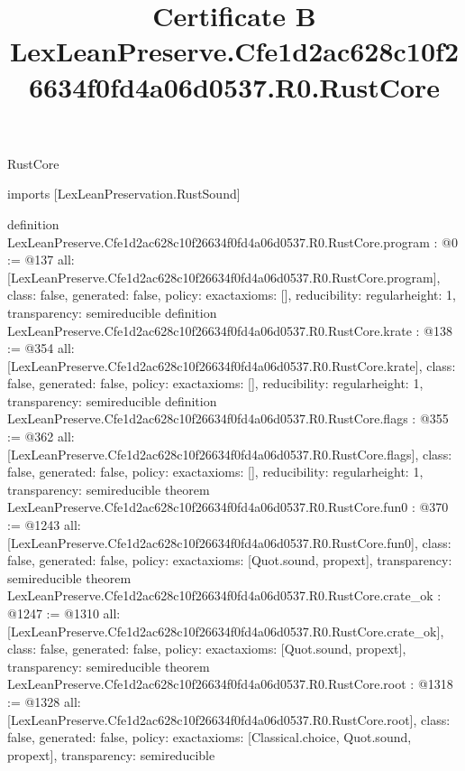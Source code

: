 \begin{lexlean}{RustCore}
\title{Certificate B LexLeanPreserve.Cfe1d2ac628c10f26634f0fd4a06d0537.R0.RustCore}
\begin{coremodule}
imports [LexLeanPreservation.RustSound]

definition LexLeanPreserve.Cfe1d2ac628c10f26634f0fd4a06d0537.R0.RustCore.program : @0 := @137 {
  all: [LexLeanPreserve.Cfe1d2ac628c10f26634f0fd4a06d0537.R0.RustCore.program],
  class: false,
  generated: false,
  policy: exact{axioms: []},
  reducibility: regular{height: 1},
  transparency: semireducible
}
definition LexLeanPreserve.Cfe1d2ac628c10f26634f0fd4a06d0537.R0.RustCore.krate : @138 := @354 {
  all: [LexLeanPreserve.Cfe1d2ac628c10f26634f0fd4a06d0537.R0.RustCore.krate],
  class: false,
  generated: false,
  policy: exact{axioms: []},
  reducibility: regular{height: 1},
  transparency: semireducible
}
definition LexLeanPreserve.Cfe1d2ac628c10f26634f0fd4a06d0537.R0.RustCore.flags : @355 := @362 {
  all: [LexLeanPreserve.Cfe1d2ac628c10f26634f0fd4a06d0537.R0.RustCore.flags],
  class: false,
  generated: false,
  policy: exact{axioms: []},
  reducibility: regular{height: 1},
  transparency: semireducible
}
theorem LexLeanPreserve.Cfe1d2ac628c10f26634f0fd4a06d0537.R0.RustCore.fun0 : @370 := @1243 {
  all: [LexLeanPreserve.Cfe1d2ac628c10f26634f0fd4a06d0537.R0.RustCore.fun0],
  class: false,
  generated: false,
  policy: exact{axioms: [Quot.sound, propext]},
  transparency: semireducible
}
theorem LexLeanPreserve.Cfe1d2ac628c10f26634f0fd4a06d0537.R0.RustCore.crate_ok : @1247 := @1310 {
  all: [LexLeanPreserve.Cfe1d2ac628c10f26634f0fd4a06d0537.R0.RustCore.crate_ok],
  class: false,
  generated: false,
  policy: exact{axioms: [Quot.sound, propext]},
  transparency: semireducible
}
theorem LexLeanPreserve.Cfe1d2ac628c10f26634f0fd4a06d0537.R0.RustCore.root : @1318 := @1328 {
  all: [LexLeanPreserve.Cfe1d2ac628c10f26634f0fd4a06d0537.R0.RustCore.root],
  class: false,
  generated: false,
  policy: exact{axioms: [Classical.choice, Quot.sound, propext]},
  transparency: semireducible
}


\end{coremodule}
\end{lexlean}

